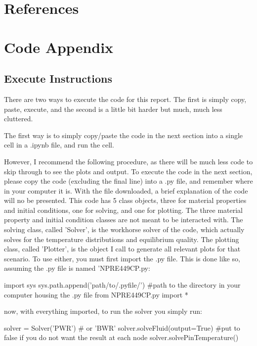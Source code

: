 \documentclass{article}
\begin{document}
\section{References}
\printbibliography[heading=none]

\clearpage
\section{Code Appendix}
\subsection{Execute Instructions}

There are two ways to execute the code for this report. The first is simply copy, paste, execute, and the second is a little bit harder but much, much less cluttered. 

The first way is to simply copy/paste the code in the next section into a single cell in a .ipynb file, and run the cell.

However, I recommend the following procedure, as there will be much less code to skip through to see the plots and output. To execute the code in the next section, please copy the code (excluding the final line) into a .py file, and remember where in your computer it is. With the file downloaded, a brief explanation of the code will no be presented. This code has 5 class objects, three for material properties and initial conditions, one for solving, and one for plotting. The three material property and initial condition classes are not meant to be interacted with. The solving class, called 'Solver', is the workhorse solver of the code, which actually solves for the temperature distributions and equilibrium quality. The plotting class, called 'Plotter', is the object I call to generate all relevant plots for that scenario. To use either, you must first import the .py file. This is done like so, assuming the .py file is named 'NPRE449CP.py:

\begin{python}
    import sys
    sys.path.append('path/to/.pyfile/') #path to the directory in your computer housing the .py file
    from NPRE449CP.py import *
\end{python}

now, with everything imported, to run the solver you simply run:

\begin{python}
    solver = Solver('PWR') # or 'BWR'
    solver.solveFluid(output=True) #put to false if you do not want the result at each node 
    solver.solvePinTemperature()
\end{python}
\end{document}
